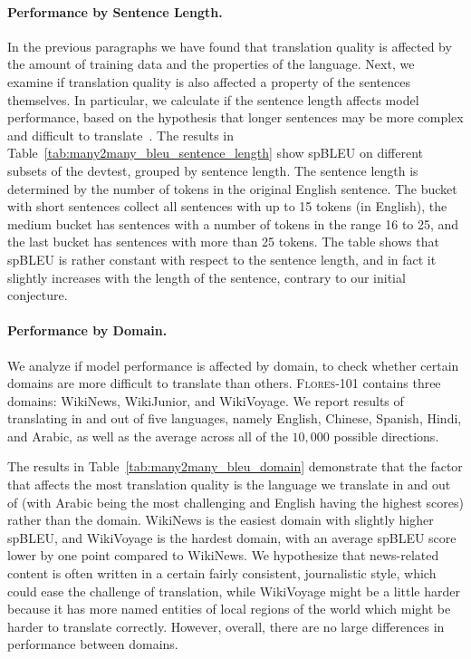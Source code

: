 \paragraph{Performance by Sentence Length.}

In the previous paragraphs we have found that translation quality is affected by the amount of training data and the properties of the language. Next, we examine if translation quality is also affected a property of the sentences themselves. In particular, we calculate if the sentence length affects model performance, based on the hypothesis that longer sentences may be more complex and difficult to translate~\citep{sutskever2014sequence}. The results in Table~\ref{tab:many2many_bleu_sentence_length} show spBLEU on different subsets of the devtest, grouped by sentence length. The sentence length is determined by the number of tokens in the original English sentence. The bucket with short sentences collect all sentences with up to 15 tokens (in English), the medium bucket has sentences with a number of tokens in the range 16 to 25, and the last bucket has sentences with more than 25 tokens. The table shows that spBLEU is rather constant with respect to the sentence length, and in fact it slightly increases with the length of the sentence, contrary to our initial conjecture. 

\paragraph{Performance by Domain.} We analyze if model performance is affected by domain, to check whether certain domains are more difficult to translate than others. 
\textsc{Flores-101} contains three domains: WikiNews, WikiJunior, and WikiVoyage. We report results of translating in and out of five languages, namely English, Chinese, Spanish, Hindi, and Arabic, as well as the average across all of the $10{,}000$ possible directions.

The results in Table~\ref{tab:many2many_bleu_domain} demonstrate that the factor that affects the most translation quality is the language we translate in and out of (with Arabic being the most challenging and English having the highest scores) rather than the domain. WikiNews is the easiest domain with slightly higher spBLEU, and WikiVoyage is the hardest domain, with an average spBLEU score lower by one point compared to WikiNews. We hypothesize that news-related content is often written in a certain fairly consistent, journalistic style, which could ease the challenge of translation, while WikiVoyage might be a little harder because it has more named entities of local regions of the world which might be harder to translate correctly. However, overall, there are no large differences in performance between domains.

